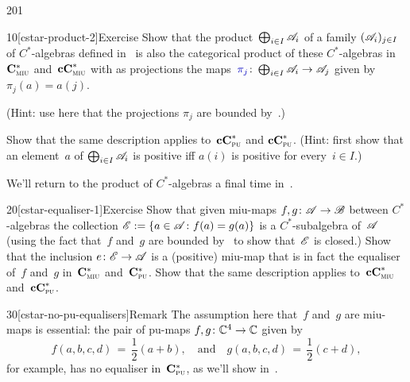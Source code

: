 \begin{parsec}{201}
\begin{point}{10}[cstar-product-2]{Exercise}%
%
Show that
the product~$\bigoplus_{i\in I}\mathscr{A}_i$
of
a family $(\mathscr{A}_i)_{j\in I}$
of $C^*$-algebras
defined in~
is also the categorical product 
of these $C^*$-algebras
    in~$\mathbf{C}^*_{\text{\textsc{miu}}}$ and~$\mathbf{cC}^*_{\text{\textsc{miu}}}$
with as projections
the maps~$\Define{\pi_j}\colon \bigoplus_{i \in I}\scrA_i\to\scrA_j$%
given by~$\pi_j(a)=a(j)$.

(Hint: use here that
the projections $\pi_j$ are bounded by~.)

Show that the same description applies to~$\mathbf{cC}^*_{\text{\textsc{pu}}}$
and $\mathbf{cC}^*_{\text{\textsc{pu}}}$.
(Hint: first show that an element~$a$
of $\bigoplus_{i\in I}\mathscr{A}_i$ is positive
    iff $a(i)$ is positive for every~$i\in I$.)

We'll return to the product of $C^*$-algebras
a final time in~.
\end{point}
\begin{point}{20}[cstar-equaliser-1]{Exercise}%
Show that given miu-maps $f,g\colon \mathscr{A}\to\mathscr{B}$
between $C^*$-algebras
the collection $\mathscr{E}:=\{a\in\mathscr{A}\colon f(a)=g(a)\}$
is a $C^*$-subalgebra
    of~$\mathscr{A}$ (using the fact that~$f$ and~$g$
    are bounded by~ to show that~$\mathscr{E}$ is closed.)
Show that the inclusion $e\colon \mathscr{E}\to\mathscr{A}$
is a (positive) miu-map
that is in fact the equaliser of~$f$ and~$g$
in~$\mathbf{C}^*_{\text{\textsc{miu}}}$ and~$\mathbf{C}^*_{\text{\textsc{pu}}}$.
Show that the same description applies
to~$\mathbf{cC}^*_{\text{\textsc{miu}}}$ and~$\mathbf{cC}^*_{\text{\textsc{pu}}}$.
\begin{point}{30}[cstar-no-pu-equalisers]{Remark}%
The assumption here that~$f$ and~$g$ are miu-maps
is essential:
the pair of pu-maps $f,g\colon \mathbb{C}^4\to\mathbb{C}$
given by
\begin{equation*}
    \textstyle
f(a,b,c,d)\,=\, \frac{1}{2}(a+b),
    \quad \text{and}\quad
g(a,b,c,d)\,=\, \frac{1}{2}(c+d),
\end{equation*}
for example,
has no equaliser
in~$\mathbf{C}^*_{\text{\textsc{pu}}}$,
as we'll show in~.
\end{point}
\end{point}
\end{parsec}

